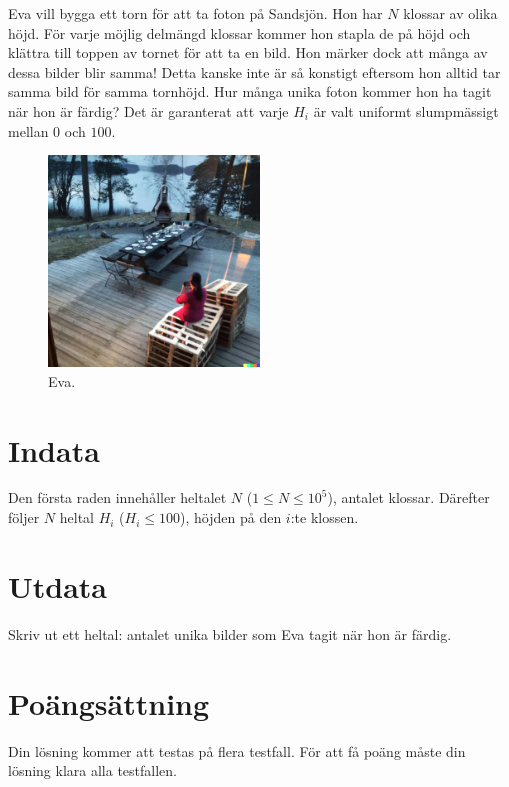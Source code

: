Eva vill bygga ett torn för att ta foton på Sandsjön. Hon har $N$ klossar av olika höjd.
För varje möjlig delmängd klossar kommer hon stapla de på höjd och klättra till toppen av tornet
för att ta en bild. Hon märker dock att många av dessa bilder blir samma! Detta kanske inte är så konstigt eftersom hon alltid tar samma bild för samma tornhöjd. Hur många unika foton kommer hon ha tagit när hon är färdig? 
Det är garanterat att varje $H_i$ är valt uniformt slumpmässigt mellan $0$ och $100$.

\begin{figure}
  \centering
    \includegraphics[width=0.5\textwidth]{eva.png}
  \caption{Eva.}
\end{figure}

\section*{Indata}
Den första raden innehåller heltalet $N$ ($1 \leq N \leq 10^5$), antalet klossar.
Därefter följer $N$ heltal $H_i$ ($H_i \leq 100$), höjden på den $i$:te klossen.
\section*{Utdata}
Skriv ut ett heltal: antalet unika bilder som Eva tagit när hon är färdig.

\section*{Poängsättning}
Din lösning kommer att testas på flera testfall.
För att få poäng måste din lösning klara alla testfallen.
